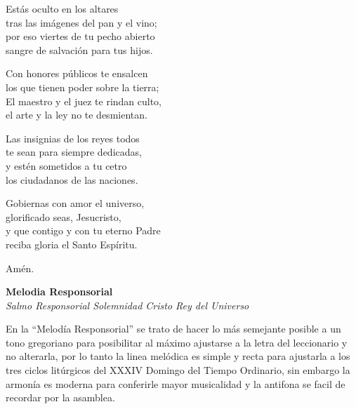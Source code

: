 \documentclass[12pt, letterpaper]{report}
\begin{document}
    \noindent
    Est\'as oculto en los altares\\
    tras las im\'agenes del pan y el vino;\\
    por eso viertes de tu pecho abierto\\
    sangre de salvaci\'on para tus hijos.

    \noindent
    Con honores p\'ublicos te ensalcen\\
    los que tienen poder sobre la tierra;\\
    El maestro y el juez te rindan  culto,\\
    el arte y la ley no te desmientan.

    \noindent
    Las insignias de los reyes todos\\
    te sean para siempre dedicadas,\\
    y est\'en sometidos a tu cetro\\
    los ciudadanos de las naciones.

    \noindent
    Gobiernas con amor el universo,\\
    glorificado seas, Jesucristo,\\
    y que contigo y con tu eterno Padre\\
    reciba gloria el Santo Esp\'iritu.

    \noindent
    Am\'en.
    \clearpage




    \begin{center}
      \LARGE \textbf{Melodia Responsorial}\\
      \Large \textit{Salmo Responsorial Solemnidad Cristo Rey del Universo}
    \end{center}

    \Large En la ``Melod\'ia Responsorial'' se trato de hacer lo m\'as semejante posible a un tono gregoriano para posibilitar al m\'aximo ajustarse a la letra del leccionario y no alterarla, por lo tanto la linea mel\'odica es simple y recta para ajustarla a los tres ciclos litúrgicos del XXXIV Domingo del Tiempo Ordinario, sin embargo la armon\'ia es moderna para conferirle mayor musicalidad y la antifona se facil de recordar por la asamblea.
\end{document}
